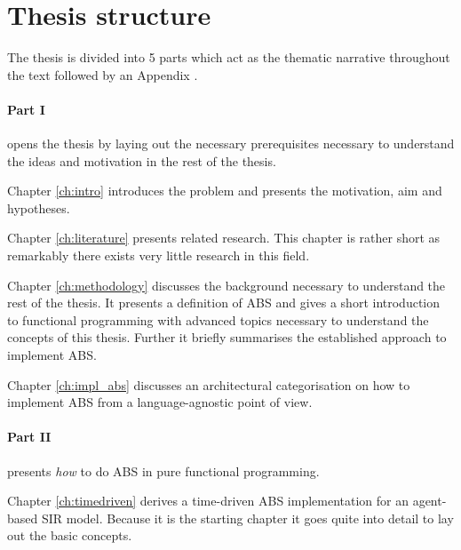 \section{Thesis structure}

The thesis is divided into 5 parts which act as the thematic narrative throughout the text followed by an Appendix . 

\paragraph{Part I} opens the thesis by laying out the necessary prerequisites necessary to understand the ideas and motivation in the rest of the thesis.
\medskip

Chapter \ref{ch:intro} introduces the problem and presents the motivation, aim and hypotheses.

\medskip

Chapter \ref{ch:literature} presents related research. This chapter is rather short as remarkably there exists very little research in this field.

\medskip

Chapter \ref{ch:methodology} discusses the background necessary to understand the rest of the thesis. It presents a definition of ABS and gives a short introduction to functional programming with advanced topics necessary to understand the concepts of this thesis. Further it briefly summarises the established approach to implement ABS.

\medskip

Chapter \ref{ch:impl_abs} discusses an architectural categorisation on how to implement ABS from a language-agnostic point of view. 

\medskip

\paragraph{Part II} presents \textit{how} to do ABS in pure functional programming. 
\medskip

Chapter \ref{ch:timedriven} derives a time-driven ABS implementation for an agent-based SIR model. Because it is the starting chapter it goes quite into detail to lay out the basic concepts.

\medskip

